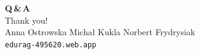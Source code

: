 \documentclass[aspectratio=169]{beamer}
\begin{document}
{
\begin{frame}
  \color{white}
  \vspace{1.8cm}
  \begin{center}
    {\Huge\bfseries Q\,\&\,A}\\[0.65cm]
    {\large Thank you!}\\[0.5cm]
    {\normalsize
      Anna Ostrowska
      \quad\textbullet\quad
      Micha\l{} Kukla
      \quad\textbullet\quad
      Norbert Frydrysiak}\\[0.25cm]
    {\footnotesize\color{white!65}\texttt{edurag-495620.web.app}}
  \end{center}
\end{frame}}
\end{document}
